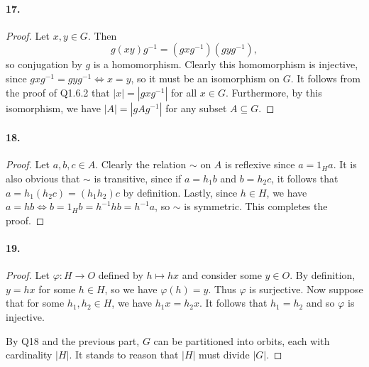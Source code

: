 \documentclass{article}
\begin{document}
\paragraph{17.}
\begin{proof}
  Let $x, y \in G$. Then \[
    g(xy)g^{-1} = (gxg^{-1})(gyg^{-1}),
  \] so conjugation by $g$ is a homomorphism. Clearly this homomorphism is
  injective, since $gxg^{-1} = gyg^{-1} \iff x = y$, so it must be an
  isomorphism on $G$. It follows from the proof of Q1.6.2 that $|x| =
  |gxg^{-1}|$ for all $x \in G$. Furthermore, by this isomorphism, we have
  $|A| = |gAg^{-1}|$ for any subset $A \subseteq G$.
\end{proof}

\paragraph{18.}
\begin{proof}
  Let $a, b, c \in A$. Clearly the relation $\sim$ on $A$ is reflexive since
  $a = 1_Ha$. It is also obvious that $\sim$ is transitive, since if $a = h_1b$
  and $b = h_2c$, it follows that $a = h_1(h_2c) = (h_1h_2)c$ by definition.
  Lastly, since $h \in H$, we have $a = hb \iff b = 1_Hb = h^{-1}hb = h^{-1}a$,
  so $\sim$ is symmetric. This completes the proof.
\end{proof}

\paragraph{19.}
\begin{proof}
  Let $\varphi: H \to O$ defined by $h \mapsto hx$ and consider some $y \in O$.
  By definition, $y = hx$ for some $h \in H$, so we have $\varphi(h) = y$. Thus
  $\varphi$ is surjective. Now suppose that for some $h_1, h_2 \in H$, we have
  $h_1x = h_2x$. It follows that $h_1 = h_2$ and so $\varphi$ is injective.

  By Q18 and the previous part, $G$ can be partitioned into orbits, each with
  cardinality $|H|$. It stands to reason that $|H|$ must divide $|G|$.
\end{proof}
\end{document}
